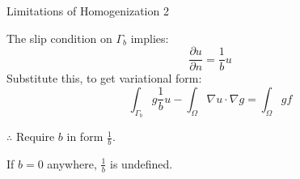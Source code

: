 \documentclass{beamer}
\begin{document}
\begin{frame}{Limitations of Homogenization 2}

The slip condition on $\Gamma_b$ implies:
\begin{equation}
\frac{\partial u}{\partial n} = \frac{1}{b}u
\end{equation}
Substitute this, to get variational form:
\begin{equation}
\int_{\Gamma_b} g \frac{1}{b} u 
 - \int_{\Omega} \nabla u \cdot \nabla g  
= \int_{\Omega} g f
\end{equation}


$\therefore$ Require $b$ in form $\displaystyle \frac{1}{b}$.

\vspace{1em}
If $b=0$ anywhere, $\frac{1}{b}$ is undefined.

\end{frame}
\end{document}
